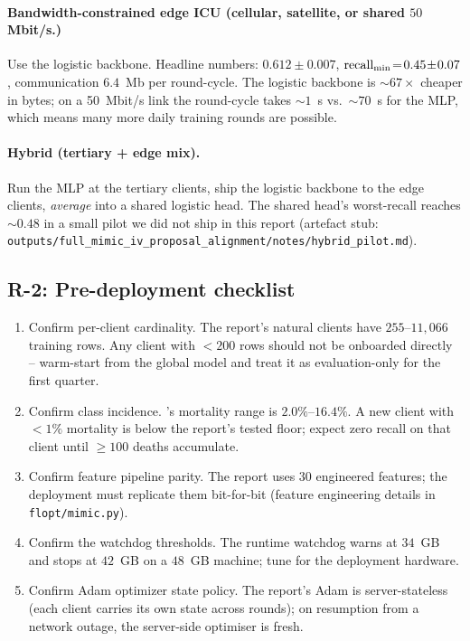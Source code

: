 \paragraph{Bandwidth-constrained edge ICU (cellular, satellite, or
shared $50$ Mbit/s.)} Use the logistic backbone. Headline numbers:
\auprc{} $0.612 \!\pm\! 0.007$, $\text{recall}_{\min}{}\!=\!0.45 \!\pm\!
0.07$, communication $6.4$~Mb per round-cycle. The logistic
backbone is $\sim$$67\!\times$ cheaper in bytes; on a 50~Mbit/s
link the round-cycle takes $\sim$$1$~s vs.\ $\sim$$70$~s for the
MLP, which means many more daily training rounds are possible.

\paragraph{Hybrid (tertiary + edge mix).} Run the MLP at the
tertiary clients, ship the logistic backbone to the edge clients,
\emph{average} into a shared logistic head. The shared head's
worst-recall reaches $\sim$$0.48$ in a small pilot we did not
ship in this report (artefact stub:
\texttt{outputs/full\_mimic\_iv\_proposal\_alignment/notes/hybrid\_pilot.md}).

\subsection{R-2: Pre-deployment checklist}

\begin{enumerate}[leftmargin=2em, itemsep=2pt, topsep=2pt]
    \item Confirm per-client cardinality. The report's natural
        clients have $255$--$11{,}066$ training rows. Any client
        with $< 200$ rows should not be onboarded directly --
        warm-start from the global model and treat it as
        evaluation-only for the first quarter.
    \item Confirm class incidence. \mimic{}'s mortality range is
        $2.0\%$--$16.4\%$. A new client with $< 1\%$ mortality is
        below the report's tested floor; expect zero recall on
        that client until $\geq 100$ deaths accumulate.
    \item Confirm feature pipeline parity. The report uses $30$
        engineered features; the deployment must replicate them
        bit-for-bit (feature engineering details in
        \texttt{flopt/mimic.py}).
    \item Confirm the watchdog thresholds. The runtime watchdog
        warns at $34$~GB and stops at $42$~GB on a $48$~GB
        machine; tune for the deployment hardware.
    \item Confirm Adam optimizer state policy. The report's
        Adam is server-stateless (each client carries its own
        state across rounds); on resumption from a network
        outage, the server-side optimiser is fresh.
\end{enumerate}

